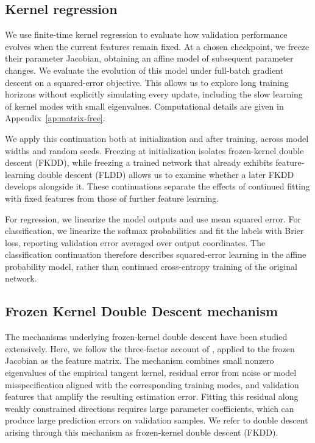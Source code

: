\documentclass[10pt]{article} %
\begin{document}
\subsection{Kernel regression}

We use finite-time kernel regression to evaluate how validation performance evolves when the current features remain fixed. At a chosen checkpoint, we freeze their parameter Jacobian, obtaining an affine model of subsequent parameter changes. We evaluate the evolution of this model under full-batch gradient descent on a squared-error objective. This allows us to explore long training horizons without explicitly simulating every update, including the slow learning of kernel modes with small eigenvalues. Computational details are given in Appendix~\ref{ap:matrix-free}.

We apply this continuation both at initialization and after training, across model widths and random seeds. Freezing at initialization isolates frozen-kernel double descent (FKDD), while freezing a trained network that already exhibits feature-learning double descent (FLDD) allows us to examine whether a later FKDD develops alongside it. These continuations separate the effects of continued fitting with fixed features from those of further feature learning.

For regression, we linearize the model outputs and use mean squared error. For classification, we linearize the softmax probabilities and fit the labels with Brier loss, reporting validation error averaged over output coordinates. The classification continuation therefore describes squared-error learning in the affine probability model, rather than continued cross-entropy training of the original network.

\subsection{Frozen Kernel Double Descent mechanism}

The mechanisms underlying frozen-kernel double descent have been studied extensively. Here, we follow the three-factor account of \citet{schaeffer2023doubledescentdemystifiedidentifying}, applied to the frozen Jacobian as the feature matrix. The mechanism combines small nonzero eigenvalues of the empirical tangent kernel, residual error from noise or model misspecification aligned with the corresponding training modes, and validation features that amplify the resulting estimation error. Fitting this residual along weakly constrained directions requires large parameter coefficients, which can produce large prediction errors on validation samples. We refer to double descent arising through this mechanism as frozen-kernel double descent (FKDD).
\end{document}
